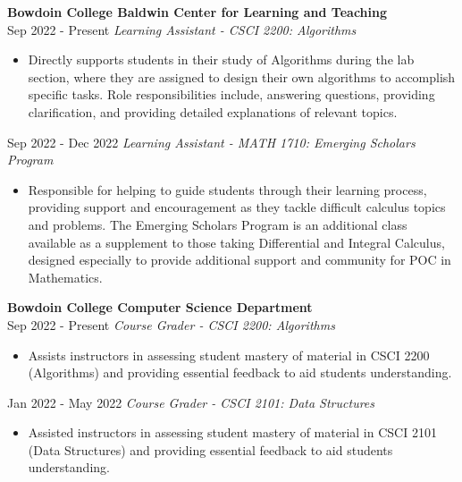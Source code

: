 \documentclass[letterpaper]{article}
\begin{document}
\textbf{Bowdoin College Baldwin Center for Learning and Teaching}\\
\vspace{1mm}
Sep 2022 - Present \hspace{3.5mm}\textbar{}\space  \textit{Learning Assistant - CSCI 2200: Algorithms}\\
\vspace{-1mm}
\begin{itemize} \itemsep 1pt
	\item Directly supports students in their study of Algorithms during the lab section, where they are assigned to design their own algorithms to accomplish specific tasks. Role responsibilities include, answering questions, providing clarification, and providing detailed explanations of relevant topics.
\end{itemize}
\vspace{-1mm}

Sep 2022 - Dec 2022 \space\textbar{}\space \textit{Learning Assistant - MATH 1710: Emerging Scholars Program}\\
\vspace{-1mm}
\begin{itemize} \itemsep 1pt
	\item Responsible for helping to guide students through their learning process, providing support and encouragement as they tackle difficult calculus topics and problems. The Emerging Scholars Program is an additional class available as a supplement to those taking Differential and Integral Calculus, designed especially to provide additional support and community for POC in Mathematics.
 
\end{itemize}
\textbf{Bowdoin College Computer Science Department}\\
\vspace{1mm}
Sep 2022 - Present \hspace{3.5mm}\textbar{}\space \textit{Course Grader - CSCI 2200: Algorithms}\\
\vspace{-1mm}
\begin{itemize} \itemsep 1pt
	\item Assists instructors in assessing student mastery of material in CSCI 2200 (Algorithms) and providing essential feedback to aid students\textquotesingle{} understanding.
 
\end{itemize}
\vspace{-1mm}
Jan 2022 - May 2022 \space\textbar{}\space \textit{Course Grader - CSCI 2101: Data Structures}\\
\vspace{-1mm}
\begin{itemize} \itemsep 1pt
	\item Assisted instructors in assessing student mastery of material in CSCI 2101 (Data Structures) and providing essential feedback to aid students\textquotesingle{} understanding.
\end{itemize}
\end{document}
